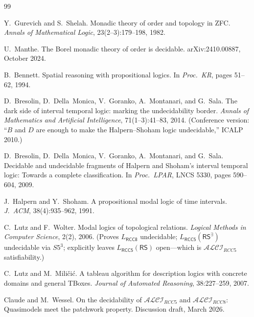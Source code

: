 \documentclass[a4paper,11pt]{article}
\theoremstyle{definition}
\newcommand{\ALCIRCC}[1]{\ensuremath{\mathcal{ALCI}_{\mathit{RCC#1}}}}
\begin{document}
\bigskip

\begin{thebibliography}{99}

Y.~Gurevich and S.~Shelah.
\newblock Monadic theory of order and topology in ZFC.
\newblock \emph{Annals of Mathematical Logic}, 23(2--3):179--198, 1982.

U.~Manthe.
\newblock The Borel monadic theory of order is decidable.
\newblock arXiv:2410.00887, October 2024.

B.~Bennett.
\newblock Spatial reasoning with propositional logics.
\newblock In \emph{Proc.\ KR}, pages 51--62, 1994.

D.~Bresolin, D.~Della~Monica, V.~Goranko, A.~Montanari, and G.~Sala.
\newblock The dark side of interval temporal logic: marking the
  undecidability border.
\newblock \emph{Annals of Mathematics and Artificial Intelligence},
  71(1--3):41--83, 2014.
\newblock (Conference version: ``$B$ and $D$ are enough to make the
  Halpern--Shoham logic undecidable,'' ICALP 2010.)

D.~Bresolin, D.~Della~Monica, V.~Goranko, A.~Montanari, and G.~Sala.
\newblock Decidable and undecidable fragments of Halpern and Shoham's
  interval temporal logic: Towards a complete classification.
\newblock In \emph{Proc.\ LPAR}, LNCS 5330, pages 590--604, 2009.

J.~Halpern and Y.~Shoham.
\newblock A propositional modal logic of time intervals.
\newblock \emph{J.\ ACM}, 38(4):935--962, 1991.

C.~Lutz and F.~Wolter.
\newblock Modal logics of topological relations.
\newblock \emph{Logical Methods in Computer Science}, 2(2), 2006.
\newblock (Proves $L_{\mathsf{RCC8}}$ undecidable;
  $L_{\mathsf{RCC5}}(\mathsf{RS}^{\exists})$ undecidable via $S5^3$;
  explicitly leaves $L_{\mathsf{RCC5}}(\mathsf{RS})$ open---which is
  $\ALCIRCC{5}$ satisfiability.)

C.~Lutz and M.~Mili\v{c}i\'{c}.
\newblock A tableau algorithm for description logics with concrete
  domains and general TBoxes.
\newblock \emph{Journal of Automated Reasoning}, 38:227--259, 2007.

Claude and M.~Wessel.
\newblock On the decidability of $\mathcal{ALCI}_{RCC5}$ and
  $\mathcal{ALCI}_{RCC8}$: Quasimodels meet the patchwork property.
\newblock Discussion draft, March 2026.


\end{thebibliography}
\end{document}
